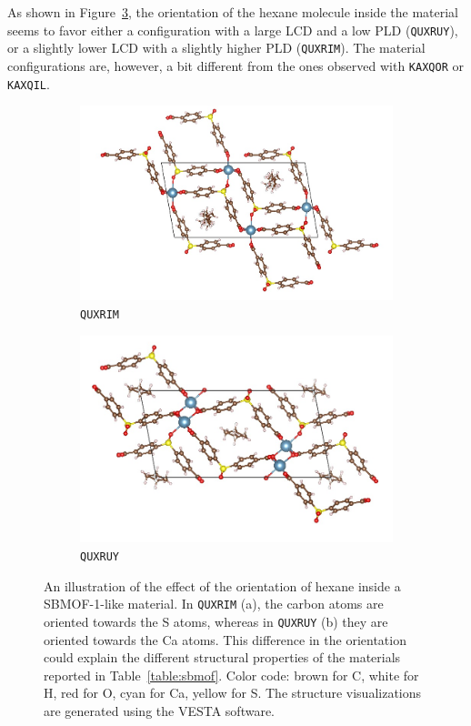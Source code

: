 \documentclass[main]{subfiles}
\begin{document}
As shown in Figure~\ref{fgr:ads_config}, the orientation of the hexane molecule inside the material seems to favor either a configuration with a large LCD and a low PLD (\texttt{QUXRUY}), or a slightly lower LCD with a slightly higher PLD (\texttt{QUXRIM}). The material configurations are, however, a bit different from the ones observed with \texttt{KAXQOR} or \texttt{KAXQIL}. 

\begin{figure}[ht]
  \centering
  \begin{subfigure}[b]{0.45\textwidth}
    \centering
    \includegraphics[height=0.6\textwidth]{figures/6-perspectives/QUXRIM.jpg}
    \caption{\texttt{QUXRIM}}\label{fgr:QUXRIM}
  \end{subfigure}
  \hfill
  \begin{subfigure}[b]{0.45\textwidth}
    \centering
    \includegraphics[height=0.6\textwidth]{figures/6-perspectives/QUXRUY.jpg}
    \caption{\texttt{QUXRUY}}\label{fgr:QUXRUY}
  \end{subfigure}
  \caption{ An illustration of the effect of the orientation of hexane inside a SBMOF-1-like material. In \texttt{QUXRIM} (a), the carbon atoms are oriented towards the S atoms, whereas in \texttt{QUXRUY} (b) they are oriented towards the Ca atoms. This difference in the orientation could explain the different structural properties of the materials reported in Table~\ref{table:sbmof}. Color code: brown for C, white for H, red for O, cyan for Ca, yellow for S. The structure visualizations are generated using the VESTA software.\autocite{VESTA}}\label{fgr:ads_config}
\end{figure}
\end{document}
